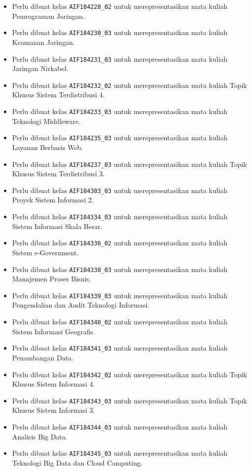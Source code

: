 \begin{enumerate}
\begin{itemize}
		\item Perlu dibuat kelas \texttt{AIF184228\_02} untuk merepresentasikan mata kuliah Pemrograman Jaringan.
		\item Perlu dibuat kelas \texttt{AIF184230\_03} untuk merepresentasikan mata kuliah Keamanan Jaringan.
		\item Perlu dibuat kelas \texttt{AIF184231\_03} untuk merepresentasikan mata kuliah Jaringan Nirkabel.
		\item Perlu dibuat kelas \texttt{AIF184232\_02} untuk merepresentasikan mata kuliah Topik Khusus Sistem Terdistribusi 4.
		\item Perlu dibuat kelas \texttt{AIF184233\_03} untuk merepresentasikan mata kuliah Teknologi Middleware.
		\item Perlu dibuat kelas \texttt{AIF184235\_03} untuk merepresentasikan mata kuliah Layanan Berbasis Web.
		\item Perlu dibuat kelas \texttt{AIF184237\_03} untuk merepresentasikan mata kuliah Topik Khusus Sistem Terdistribusi 3.
		\item Perlu dibuat kelas \texttt{AIF184303\_03} untuk merepresentasikan mata kuliah Proyek Sistem Informasi 2.
		\item Perlu dibuat kelas \texttt{AIF184334\_03} untuk merepresentasikan mata kuliah Sistem Informasi Skala Besar.
		\item Perlu dibuat kelas \texttt{AIF184336\_02} untuk merepresentasikan mata kuliah Sistem e-Government.
		\item Perlu dibuat kelas \texttt{AIF184338\_03} untuk merepresentasikan mata kuliah Manajemen Proses Bisnis.
		\item Perlu dibuat kelas \texttt{AIF184339\_03} untuk merepresentasikan mata kuliah Pengendalian dan Audit Teknologi Informasi.
		\item Perlu dibuat kelas \texttt{AIF184340\_02} untuk merepresentasikan mata kuliah Sistem Informasi Geografis.
		\item Perlu dibuat kelas \texttt{AIF184341\_03} untuk merepresentasikan mata kuliah Penambangan Data.
		\item Perlu dibuat kelas \texttt{AIF184342\_02} untuk merepresentasikan mata kuliah Topik Khusus Sistem Informasi 4.
		\item Perlu dibuat kelas \texttt{AIF184343\_03} untuk merepresentasikan mata kuliah Topik Khusus Sistem Informasi 3.
		\item Perlu dibuat kelas \texttt{AIF184344\_03} untuk merepresentasikan mata kuliah Analisis Big Data.
		\item Perlu dibuat kelas \texttt{AIF184345\_03} untuk merepresentasikan mata kuliah Teknologi Big Data dan Cloud Computing.

\end{itemize}
\end{enumerate}
